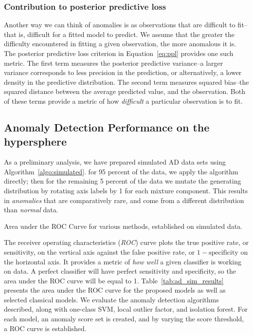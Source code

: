 \subsubsection{Contribution to posterior predictive loss}
Another way we can think of anomalies is as observations that are difficult to fit--that is, difficult
  for a fitted model to predict.  We assume that the greater the difficulty encountered in fitting a
  given observation, the more anomalous it is.  The posterior predictive loss criterion in
  Equation~\ref{eq:ppl} provides one such metric.  The first term measures the posterior predictive
  variance--a larger variance corresponds to less precision in the prediction, or alternatively, a lower
  density in the predictive distribution.  The second term measures squared bias--the squared distance
  between the average predicted value, and the observation.  Both of these terms provide a metric of
  how \emph{difficult} a particular observation is to fit.

\subsection{Anomaly Detection Performance on the hypersphere}
As a preliminary analysis, we have prepared simulated AD data sets using Algorithm~\ref{algo:simulated}.
  for 95 percent of the data, we apply the algorithm directly; then for the remaining 5 percent of the
  data we mutate the generating distribution by rotating axis labels by 1 for each mixture component.
  This results in \emph{anomalies} that are comparatively rare, and come from a different distribution
  than \emph{normal} data.

\begin{table}[ht]
  \centering
  
  \caption{Area under the ROC Curve for various methods, established on simulated
    data.\label{tab:ad_sim_results}}
\end{table}

The receiver operating characteristics (\emph{ROC}) curve plots the true positive rate, or  
  sensitivity,  on the vertical axis against the false positive rate, or $1 - \text{specificity}$
  on the horizontal axis.  It provides a metric of \emph{how well} a given classifier is working 
  on data.  A perfect classifier will have perfect sensitivity and specificity, so the area under
  the ROC curve will be equal to 1. Table~\ref{tab:ad_sim_results} presents the area under the ROC
  curve for the proposed models as well as selected classical models.  We evaluate the anomaly
  detection algorithms described, along with one-class SVM, local outlier factor, and isolation
  forest.  For each model, an anomaly score set is created, and by varying the score threshold, a
  ROC curve is established.

